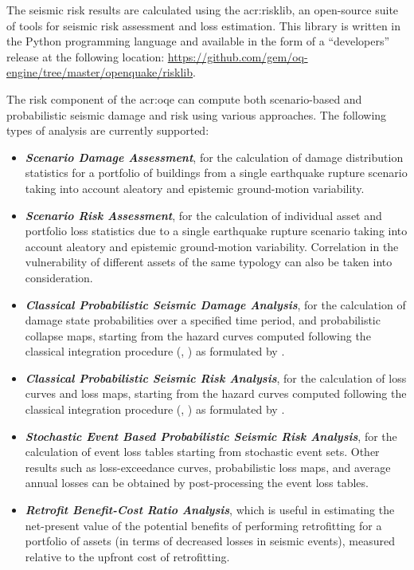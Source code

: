 
The seismic risk results are calculated using the \gls{acr:risklib}, 
an open-source suite of tools for seismic risk assessment and
loss estimation. This library is written in the Python programming language
and available in the form of a ``developers'' release at the following location:
\href{https://github.com/gem/oq-engine/tree/master/openquake/risklib}{https://github.com/gem/oq-engine/tree/master/openquake/risklib}.

The risk component of the \glsdesc{acr:oqe} can compute both scenario-based and
probabilistic seismic damage and risk using various approaches. The following
types of analysis are currently supported:

\begin{itemize}

    \item \textit{\textbf{Scenario Damage Assessment}}, for the
	calculation of damage distribution statistics for a portfolio of buildings
	from a single earthquake rupture scenario taking into account aleatory and
	epistemic ground-motion variability.

    \item \textit{\textbf{Scenario Risk Assessment}}, for the calculation of
	individual asset and portfolio loss statistics due to a single earthquake
	rupture scenario taking into account aleatory and epistemic ground-motion
	variability. Correlation in the vulnerability of different assets of the
	same typology can also be taken into consideration.

	\item \textit{\textbf{Classical Probabilistic Seismic Damage Analysis}}, for 
	the calculation of damage state probabilities over a specified time period,  
	and probabilistic collapse maps, starting from the hazard curves 
	computed following the classical integration procedure (\cite{cornell1968}, 
	\citet{mcguire1976}) as formulated by \cite{field2003}.

    \item \textit{\textbf{Classical Probabilistic Seismic Risk Analysis}}, for the
	calculation of loss curves and loss maps, starting from the hazard curves 
	computed following the classical integration procedure (\cite{cornell1968}, 
	\citet{mcguire1976}) as formulated by \cite{field2003}.

	\item \textit{\textbf{Stochastic Event Based Probabilistic Seismic Risk Analysis}}, 
	for the calculation of event loss tables starting from stochastic event sets.
	Other results such as loss-exceedance curves, probabilistic loss maps, 
	and average annual losses can be obtained by 
	post-processing the event loss tables.

    \item \textit{\textbf{Retrofit Benefit-Cost Ratio Analysis}}, which is
	useful in estimating the net-present value of the potential benefits of
	performing retrofitting for a portfolio of assets (in terms of decreased
	losses in seismic events), measured relative to the upfront cost of
	retrofitting.

\end{itemize}

